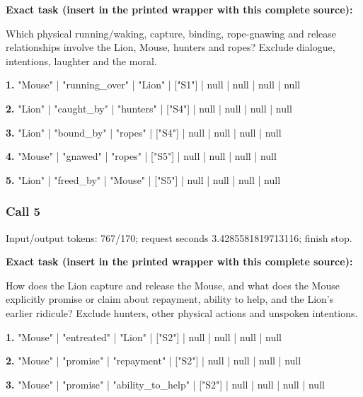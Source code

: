 \noindent\textbf{Exact task (insert in the printed wrapper with this complete source):}\par Which physical running/waking, capture, binding, rope-gnawing and release relationships involve the Lion, Mouse, hunters and ropes? Exclude dialogue, intentions, laughter and the moral.

\noindent\textbf{1.} "Mouse" | "running\_over" | "Lion" | ["S1"] | null | null | null | null\par\smallskip

\noindent\textbf{2.} "Lion" | "caught\_by" | "hunters" | ["S4"] | null | null | null | null\par\smallskip

\noindent\textbf{3.} "Lion" | "bound\_by" | "ropes" | ["S4"] | null | null | null | null\par\smallskip

\noindent\textbf{4.} "Mouse" | "gnawed" | "ropes" | ["S5"] | null | null | null | null\par\smallskip

\noindent\textbf{5.} "Lion" | "freed\_by" | "Mouse" | ["S5"] | null | null | null | null\par\smallskip

\subsubsection*{Call 5}

Input/output tokens: 767/170; request seconds 3.4285581819713116; finish stop.

\noindent\textbf{Exact task (insert in the printed wrapper with this complete source):}\par How does the Lion capture and release the Mouse, and what does the Mouse explicitly promise or claim about repayment, ability to help, and the Lion's earlier ridicule? Exclude hunters, other physical actions and unspoken intentions.

\noindent\textbf{1.} "Mouse" | "entreated" | "Lion" | ["S2"] | null | null | null | null\par\smallskip

\noindent\textbf{2.} "Mouse" | "promise" | "repayment" | ["S2"] | null | null | null | null\par\smallskip

\noindent\textbf{3.} "Mouse" | "promise" | "ability\_to\_help" | ["S2"] | null | null | null | null\par\smallskip


